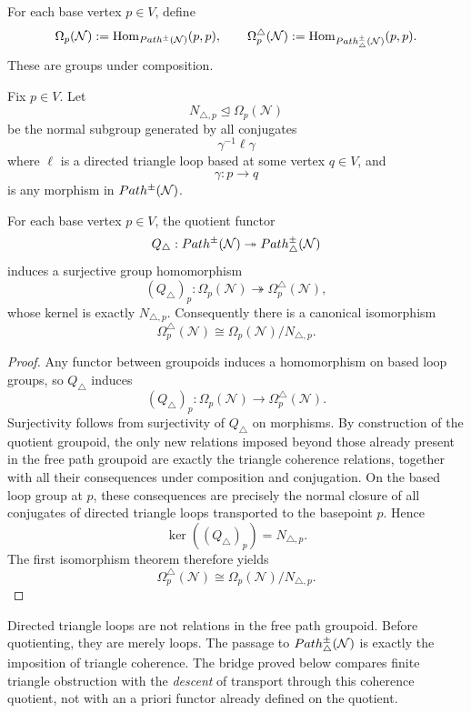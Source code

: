 \begin{definition}
	For each base vertex \(p\in V\), define
	\[
		\Omega_p(\mathcal N)
		:=
		\operatorname{Hom}_{Path^\pm(\mathcal N)}(p,p),
		\qquad
		\Omega_p^\triangle(\mathcal N)
		:=
		\operatorname{Hom}_{Path^\pm_\triangle(\mathcal N)}(p,p).
	\]
	These are groups under composition.
\end{definition}
\begin{definition}
	Fix \(p\in V\). Let
	\[
		N_{\triangle,p}\trianglelefteq \Omega_p(\mathcal N)
	\]
	be the normal subgroup generated by all conjugates
	\[
		\gamma^{-1}\ell\gamma
	\]
	where \(\ell\) is a directed triangle loop based at some vertex
	\(q\in V\), and
	\[
		\gamma:p\to q
	\]
	is any morphism in \(Path^\pm(\mathcal N)\).
\end{definition}
\begin{theorem}
	\label{thm:bridge-loop-quotient}
	For each base vertex \(p\in V\), the quotient functor
	\[
		Q_\triangle:Path^\pm(\mathcal N)\twoheadrightarrow
		Path^\pm_\triangle(\mathcal N)
	\]
	induces a surjective group homomorphism
	\[
		(Q_\triangle)_p:\Omega_p(\mathcal N)\twoheadrightarrow
		\Omega_p^\triangle(\mathcal N),
	\]
	whose kernel is exactly \(N_{\triangle,p}\). Consequently there is a
	canonical isomorphism
	\[
		\Omega_p^\triangle(\mathcal N)\cong
		\Omega_p(\mathcal N)/N_{\triangle,p}.
	\]
\end{theorem}
\begin{proof}
	Any functor between groupoids induces a homomorphism on based loop
	groups, so \(Q_\triangle\) induces
	\[
		(Q_\triangle)_p:\Omega_p(\mathcal N)\to\Omega_p^\triangle(\mathcal N).
	\]
	Surjectivity follows from surjectivity of \(Q_\triangle\) on morphisms.
	By construction of the quotient groupoid, the only new relations
	imposed beyond those already present in the free path groupoid are
	exactly the triangle coherence relations, together with all their
	consequences under composition and conjugation. On the based loop
	group at \(p\), these consequences are precisely the normal closure of
	all conjugates of directed triangle loops transported to the basepoint
	\(p\). Hence
	\[
		\ker((Q_\triangle)_p)=N_{\triangle,p}.
	\]
	The first isomorphism theorem therefore yields
	\[
		\Omega_p^\triangle(\mathcal N)\cong
		\Omega_p(\mathcal N)/N_{\triangle,p}.
	\]
\end{proof}
\begin{remark}
	Directed triangle loops are not relations in the free path groupoid.
	Before quotienting, they are merely loops. The passage to
	\(Path^\pm_\triangle(\mathcal N)\) is exactly the imposition of
	triangle coherence. The bridge proved below compares finite triangle
	obstruction with the \emph{descent} of transport through this coherence
	quotient, not with an a priori functor already defined on the quotient.
\end{remark}
